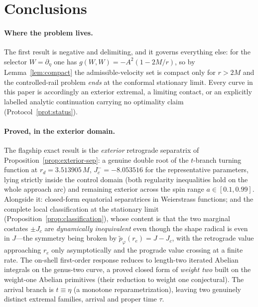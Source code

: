 \documentclass[12pt]{iopart}
\theoremstyle{plain}
\theoremstyle{definition}
\theoremstyle{remark}
\newcommand{\re}{r_{e}}
\newcommand{\Jc}{J_{c}}
\begin{document}

\section{Conclusions}
\label{sec:concl-II}
\paragraph{Where the problem lives.} The first result is negative and delimiting, and it
governs everything else: for the selector $W=\partial_\eta$ one has
$g(W,W)=-A^2(1-2M/r)$, so by Lemma~\ref{lem:compact} the admissible-velocity set is
compact only for $r>2M$ and the controlled-rail problem \emph{ends} at the conformal
stationary limit. Every curve in this paper is accordingly an exterior extremal, a
limiting contact, or an explicitly labelled analytic continuation carrying no optimality
claim (Protocol~\ref{prot:status}).

\paragraph{Proved, in the exterior domain.} The flagship exact result is the
\emph{exterior} retrograde separatrix of Proposition~\ref{prop:exterior-sep}: a genuine
double root of the $t$-branch turning function at
$r_d=3.513905\,M$, $J_c^{-}=-8.053516$ for the representative parameters, lying strictly
inside the control domain (both regularity inequalities hold on the whole approach arc)
and remaining exterior across the spin range $a\in[0.1,0.99]$. Alongside it: closed-form
equatorial separatrices in Weierstrass functions; and the complete local classification at
the stationary limit (Proposition~\ref{prop:classification}), whose content is that the two
marginal costates $\pm\Jc$ are \emph{dynamically inequivalent} even though the shape
radical is even in $J$---the symmetry being broken by $\tilde p_\varphi(\re)=J-\Jc$, with
the retrograde value approaching $\re$ only asymptotically and the prograde value crossing
at a finite rate. The on-shell first-order response reduces to length-two iterated Abelian
integrals on the genus-two curve, a proved closed form of \emph{weight two} built on the
weight-one Abelian primitives (their reduction to weight one conjectural). The arrival
branch is $t\equiv\eta$ (a monotone reparametrization), leaving two genuinely distinct
extremal families, arrival and proper time $\tau$.
\end{document}
